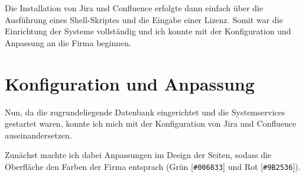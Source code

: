 \documentclass[xcolor=dvipsnames,11pt,paper=a4paper]{report}
\begin{document}
Die Installation von Jira und Confluence erfolgte dann einfach über die Ausführung
eines Shell-Skriptes und die Eingabe einer Lizenz. Somit war die Einrichtung der
Systeme vollständig und ich konnte mit der Konfiguration und Anpassung an die Firma
beginnen.



\section{Konfiguration und Anpassung}
\label{sec:jira-konfiguration}

Nun, da die zugrundeliegende Datenbank eingerichtet und die Systemservices gestartet
waren, konnte ich mich mit der Konfiguration von Jira und Confluence auseinandersetzen.

Zunächst machte ich dabei Anpassungen im Design der Seiten, sodass die Oberfläche
den Farben der Firma entsprach (\textcolor[HTML]{006833}{Grün [\texttt{\#006833}]}
und \textcolor[HTML]{9B2536}{Rot [\texttt{\#9B2536}]}).




\end{document}
